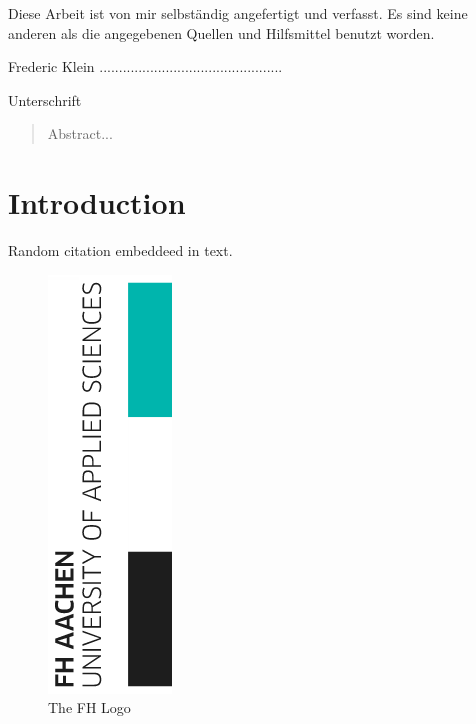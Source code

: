 
%



	
\restoregeometry


\clearpage
\vspace*{\fill}
\begin{center}
	\begin{minipage}{.8\textwidth}
		\thispagestyle{empty} %
		Diese Arbeit ist von mir selbst\"andig angefertigt und verfasst. Es sind keine anderen als die angegebenen Quellen und Hilfsmittel benutzt worden.\par
		\vspace{1cm}
		Frederic Klein ...............................................\par
		Unterschrift
	\end{minipage}
\end{center}
\vfill %
\clearpage


\begin{abstract}
	\thispagestyle{plain}
	\setcounter{page}{1}
	Abstract...
\end{abstract}

\tableofcontents
\setcounter{page}{2}
\listoffigures

\chapter{Introduction}

\lipsum[1]
Random citation \autocite{DUMMY:1} embeddeed in text.\par
\lipsum[2]
\begin{figure}
	\caption{The FH Logo}
	\includegraphics[scale=0.5]{figures/FH-logo.png}
\end{figure}
